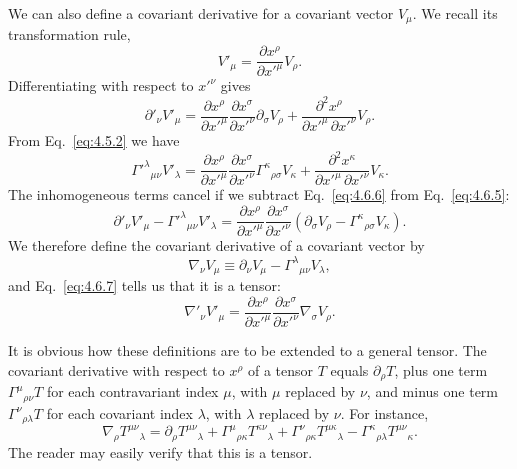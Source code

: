 We can also define a covariant derivative for a covariant vector \(V_\mu\).
We recall its transformation rule,
\[
  V'_\mu=\frac{\partial x^\rho}{\partial x'^\mu}V_\rho.
\]
Differentiating with respect to \(x'^\nu\) gives
\begin{equation}
  \partial'_\nu V'_\mu
  =
  \frac{\partial x^\rho}{\partial x'^\mu}
  \frac{\partial x^\sigma}{\partial x'^\nu}
  \partial_\sigma V_\rho
  +
  \frac{\partial^2x^\rho}
       {\partial x'^\mu\,\partial x'^\nu}V_\rho.
  \tag{4.6.5}\label{eq:4.6.5}
\end{equation}
From Eq.~\eqref{eq:4.5.2} we have
\begin{equation}
  \Gamma'^\lambda{}_{\mu\nu}V'_\lambda
  =
  \frac{\partial x^\rho}{\partial x'^\mu}
  \frac{\partial x^\sigma}{\partial x'^\nu}
  \Gamma^\kappa{}_{\rho\sigma}V_\kappa
  +
  \frac{\partial^2x^\kappa}
       {\partial x'^\mu\,\partial x'^\nu}V_\kappa.
  \tag{4.6.6}\label{eq:4.6.6}
\end{equation}
The inhomogeneous terms cancel if we subtract Eq.~\eqref{eq:4.6.6} from
Eq.~\eqref{eq:4.6.5}:
\begin{equation}
  \partial'_\nu V'_\mu-\Gamma'^\lambda{}_{\mu\nu}V'_\lambda
  =
  \frac{\partial x^\rho}{\partial x'^\mu}
  \frac{\partial x^\sigma}{\partial x'^\nu}
  \left(
    \partial_\sigma V_\rho-\Gamma^\kappa{}_{\rho\sigma}V_\kappa
  \right).
  \tag{4.6.7}\label{eq:4.6.7}
\end{equation}
We therefore define the covariant derivative of a covariant vector by
\begin{equation}
  \nabla_\nu V_\mu
  \equiv
  \partial_\nu V_\mu-\Gamma^\lambda{}_{\mu\nu}V_\lambda,
  \tag{4.6.8}\label{eq:4.6.8}
\end{equation}
and Eq.~\eqref{eq:4.6.7} tells us that it is a tensor:
\begin{equation}
  \nabla'_\nu V'_\mu
  =
  \frac{\partial x^\rho}{\partial x'^\mu}
  \frac{\partial x^\sigma}{\partial x'^\nu}
  \nabla_\sigma V_\rho.
  \tag{4.6.9}\label{eq:4.6.9}
\end{equation}

It is obvious how these definitions are to be extended to a general tensor.
The covariant derivative with respect to \(x^\rho\) of a tensor \(T\) equals
\(\partial_\rho T\), plus one term
\(\Gamma^\mu{}_{\rho\nu}T\) for each contravariant index \(\mu\), with
\(\mu\) replaced by \(\nu\), and minus one term
\(\Gamma^\nu{}_{\rho\lambda}T\) for each covariant index \(\lambda\), with
\(\lambda\) replaced by \(\nu\). For instance,
\begin{equation}
  \nabla_\rho T^{\mu\nu}{}_\lambda
  =
  \partial_\rho T^{\mu\nu}{}_\lambda
  +\Gamma^\mu{}_{\rho\kappa}T^{\kappa\nu}{}_\lambda
  +\Gamma^\nu{}_{\rho\kappa}T^{\mu\kappa}{}_\lambda
  -\Gamma^\kappa{}_{\rho\lambda}T^{\mu\nu}{}_\kappa.
  \tag{4.6.10}\label{eq:4.6.10}
\end{equation}
The reader may easily verify that this is a tensor.


